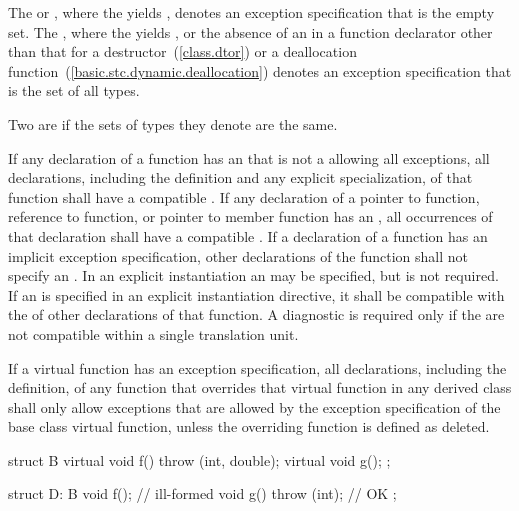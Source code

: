 \pnum
The 
 or \tcode{)},
where the  yields ,
denotes an exception specification
that is the empty set.
The 
\tcode{)},
where the  yields ,
or the absence of an 
in a function declarator other than that
for a destructor~(\ref{class.dtor})
or a deallocation function~(\ref{basic.stc.dynamic.deallocation})
denotes an exception specification
that is the set of all types.

\pnum
{}%
Two  are
 if
the sets of types they denote are the same.

\pnum
If any declaration of a function has an
that is not a  allowing all exceptions,
all declarations, including the definition and any explicit specialization,
of that function shall have a compatible
.
If any declaration of a pointer to function, reference to function,
or pointer to member function has an
,
all occurrences of that declaration shall have a compatible
.
If a declaration of a function has an implicit
exception specification,
other declarations of the function shall not specify an
.
In an explicit instantiation an
may be specified, but is not required.
If an
is specified in an explicit instantiation directive, it shall
be compatible with the  of
other declarations of that function.
A diagnostic is required only if the
 are not compatible
within a single translation unit.

\pnum
{}%
If a virtual function has an
exception specification,
all declarations, including the definition, of any function
that overrides that virtual function in any derived class
shall only allow exceptions that are allowed by the
exception specification
of the base class virtual function,
unless the overriding function is defined as deleted.
\enterexample
\begin{codeblock}
struct B {
  virtual void f() throw (int, double);
  virtual void g();
};

struct D: B {
  void f();                     // ill-formed
  void g() throw (int);         // OK
};
\end{codeblock}

